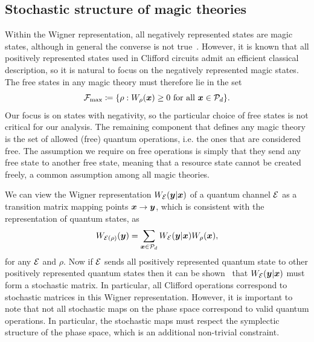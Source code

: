 \documentclass[pra,
aps,
twocolumn,
superscriptaddress,
groupedaddress,
nofootinbib,
reprint
]{revtex4-1}
\begin{document}

\subsection{Stochastic structure of magic theories}
\label{sec:struc}

Within the Wigner representation, all negatively represented states are magic states, although in general the converse is not true~\cite{cit:campbell}. However, it is known that all positively represented states used in Clifford circuits admit an efficient classical description, so it is natural to focus on the negatively represented magic states. The free states in any magic theory must therefore lie in the set
\begin{equation}
    \Fmax \coloneqq \{ \rho: \W[\bmx]{\rho} \geq 0 \text{ for all } \bmx \in \cal{P}_d\}.
\end{equation}
Our focus is on states with negativity, so the particular choice of free states is not critical for our analysis. The remaining component that defines any magic theory is the set of allowed (free) quantum operations, i.e. the ones that are considered free. The assumption we require on free operations is simply that they send any free state to another free state, meaning that a resource state cannot be created freely, a common assumption among all magic theories.


We can view the Wigner representation $W_{\mathcal{E}}( \boldsymbol{y} | \boldsymbol{x})$ of a quantum channel $\mathcal{E}$ as a transition matrix mapping points $\boldsymbol{x} \rightarrow \boldsymbol{y}$, which is consistent with the representation of quantum states, as
\begin{equation}
	W_{\mathcal{E}(\rho)} (\boldsymbol{y}) = \sum_{\boldsymbol{x} \in {\mathcal P}_d} W_{\mathcal{E}}( \boldsymbol{y} | \boldsymbol{x}) W_\rho(\boldsymbol{x}),
\end{equation}
for any $\mathcal{E}$ and $\rho$. Now if $\mathcal{E}$ sends all positively represented quantum state to other positively represented quantum states then it can be shown~\cite{Wang_2019} that $W_{\mathcal{E}}(\boldsymbol{y} |\boldsymbol{x})$ must form a stochastic matrix. In particular, all Clifford operations correspond to stochastic matrices in this Wigner representation. However, it is important to note that not all stochastic maps on the phase space correspond to valid quantum operations. In particular, the stochastic maps must respect the symplectic structure of the phase space, which is an additional non-trivial constraint.
\end{document}
